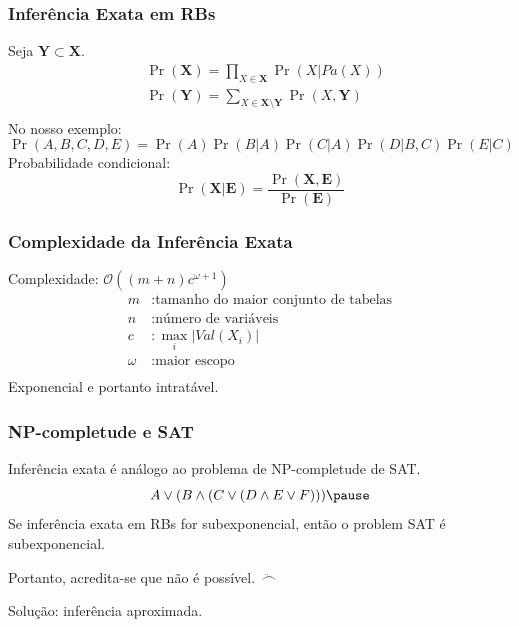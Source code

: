 \documentclass[10pt]{beamer}
\theoremstyle{plain}
\newcommand{\set}[1]{\mathbf{#1}}
\newcommand{\bigo}{\mathcal{O}}
\newcommand{\p}{\pause}
\begin{document}
\begingroup
\scriptsize
\begin{frame}
  \frametitle{Inferência Exata em RBs}

  Seja $\set{Y}\subset\set{X}$.
  \begin{align*}
    &\Pr(\set{X})=\prod_{X\in\set{X}} \Pr(X|Pa(X))\\
    &\Pr(\set{Y})=\sum_{X\in\set{X}\setminus\set{Y}} \Pr(X, \set{Y})\\
  \end{align*}
  No nosso exemplo:
  \begin{equation*}
    \Pr(A,B,C,D,E)=\Pr(A)\Pr(B|A)\Pr(C|A)\Pr(D|B,C)\Pr(E|C)
  \end{equation*}
  Probabilidade condicional:
  \begin{equation*}
    \Pr(\set{X}|\set{E})=\frac{\Pr(\set{X},\set{E})}{\Pr(\set{E})}
  \end{equation*}
\end{frame}
\endgroup

\begin{frame}
  \frametitle{Complexidade da Inferência Exata}

  Complexidade: $\bigo((m+n)c^{\omega+1})$
  \begin{align*}
    m &: \text{tamanho do maior conjunto de tabelas}\\
    n &: \text{número de variáveis}\\
    c &: \max_i |Val(X_i)|\\
    \omega &: \text{maior escopo}\\
  \end{align*}
  Exponencial e portanto intratável.
\end{frame}

\begin{frame}
  \frametitle{NP-completude e SAT}
  Inferência exata é análogo ao problema de NP-completude de SAT\@.\p
  \begin{equation*}
    A\vee(B\wedge(C\vee (D\wedge E\vee F)))\p
  \end{equation*}
  Se inferência exata em RBs for subexponencial, então o problem SAT é subexponencial.\p

  \p

  Portanto, acredita-se que não é possível.~$\ddot\frown$\p

  Solução: inferência aproximada.
\end{frame}
\end{document}
